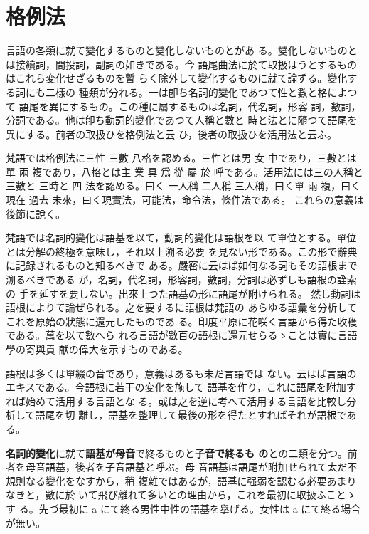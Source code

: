 \section{格例法}
\numberParagraph
言語の各類に就て變化するものと變化しないものとがあ
る。變化しないものとは接續詞，間投詞，副詞の如きである。今
語尾曲法に於て取扱はうとするものはこれら変化せざるものを暫
らく除外して變化するものに就て論ずる。變化する詞にも二樣の
種類が分れる。一は卽ち名詞的變化であつて性と數と格によつて
語尾を異にするもの。この種に屬するものは名詞，代名詞，形容
詞，數詞，分詞である。他は卽ち動詞的變化であつて人稱と數と
時と法とに隨つて語尾を異にする。前者の取扱ひを格例法と云
ひ，後者の取扱ひを活用法と云ふ。

\numberParagraph
梵語では格例法に三性 三數 八格を認める。三性とは男
女 中であり，三數とは單 兩 複であり，八格とは主 業 具 爲
從 屬 於 呼である。活用法には三の人稱と 三數と 三時と 四
法を認める。曰く 一人稱 二人稱 三人稱，曰く單 兩 複，曰く
現在 過去 未來，曰く現實法，可能法，命令法，條件法である。
これらの意義は後節に說く。

\numberParagraph
梵語では名詞的變化は語基を以て，動詞的變化は語根を以
て單位とする。單位とは分解の終極を意味し，それ以上溯る必要
を見ない形である。この形で辭典に記録されるものと知るべきで
ある。嚴密に云はば如何なる詞もその語根まで溯るべきである
が，名詞，代名詞，形容詞，數詞，分詞は必ずしも語根の詮索の
手を延すを要しない。出來上つた語基の形に語尾が附けられる。
然し動詞は語根によりて論ぜられる。之を要するに語根は梵語の
あらゆる語彙を分析してこれを原始の狀態に還元したものであ
る。印度平原に花咲く言語から得た收穫である。萬を以て數へら
れる言語が數百の語根に還元せらるゝことは實に言語學の寄與貢
献の偉大を示すものである。

\numberParagraph
語根は多くは單綴の音であり，意義はあるも未だ言語では
ない。云はば言語のエキスである。今語根に若干の変化を施して
語基を作り，これに語尾を附加すれば始めて活用する言語とな
る。或は之を逆に考へて活用する言語を比較し分析して語尾を切
離し，語基を整理して最後の形を得たとすればそれが語根であ
る。

\numberParagraph
\textbf{名詞的變化}に就て\textbf{語基が母音}で終るものと\textbf{子音で終るも
  の}との二類を分つ。前者を母音語基，後者を子音語基と呼ぶ。母
音語基は語尾が附加せられて太だ不規則なる變化をなすから，稍
複雜ではあるが，語基に强弱を認むる必要あまりなきと，數に於
いて飛び離れて多いとの理由から，これを最初に取扱ふことゝす
る。先づ最初に a にて終る男性中性の語基を擧げる。女性は a
にて終る場合が無い。

